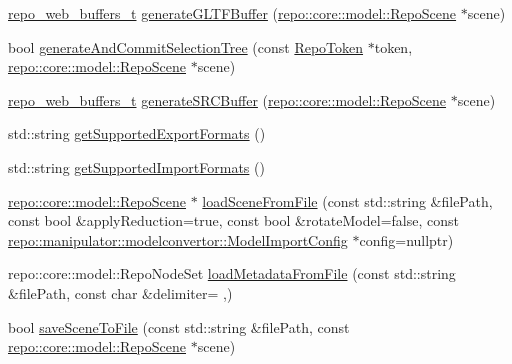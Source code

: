 \begin{DoxyCompactItemize}
\item 
\hyperlink{structrepo__web__buffers__t}{repo\+\_\+web\+\_\+buffers\+\_\+t} \hyperlink{class_repo_controller_1_1___repo_controller_impl_aed03fc24e4dd110f15bd4b6be107b732}{generate\+G\+L\+T\+F\+Buffer} (\hyperlink{classrepo_1_1core_1_1model_1_1_repo_scene}{repo\+::core\+::model\+::\+Repo\+Scene} $\ast$scene)
\item 
bool \hyperlink{class_repo_controller_1_1___repo_controller_impl_a0ae1a2789c4ff637b6578f372630cbdd}{generate\+And\+Commit\+Selection\+Tree} (const \hyperlink{class_repo_controller_1_1_repo_token}{Repo\+Token} $\ast$token, \hyperlink{classrepo_1_1core_1_1model_1_1_repo_scene}{repo\+::core\+::model\+::\+Repo\+Scene} $\ast$scene)
\item 
\hyperlink{structrepo__web__buffers__t}{repo\+\_\+web\+\_\+buffers\+\_\+t} \hyperlink{class_repo_controller_1_1___repo_controller_impl_ae34610e33c3acb775a8a6d2eb3a8474a}{generate\+S\+R\+C\+Buffer} (\hyperlink{classrepo_1_1core_1_1model_1_1_repo_scene}{repo\+::core\+::model\+::\+Repo\+Scene} $\ast$scene)
\item 
std\+::string \hyperlink{class_repo_controller_1_1___repo_controller_impl_a41dd45129cf941a698906ce4078549b1}{get\+Supported\+Export\+Formats} ()
\item 
std\+::string \hyperlink{class_repo_controller_1_1___repo_controller_impl_a2e6d9e9a575c6302f2c887afd190190f}{get\+Supported\+Import\+Formats} ()
\item 
\hyperlink{classrepo_1_1core_1_1model_1_1_repo_scene}{repo\+::core\+::model\+::\+Repo\+Scene} $\ast$ \hyperlink{class_repo_controller_1_1___repo_controller_impl_a5cf378dadbbb99c1163b29bf5f7d7e12}{load\+Scene\+From\+File} (const std\+::string \&file\+Path, const bool \&apply\+Reduction=true, const bool \&rotate\+Model=false, const \hyperlink{classrepo_1_1manipulator_1_1modelconvertor_1_1_model_import_config}{repo\+::manipulator\+::modelconvertor\+::\+Model\+Import\+Config} $\ast$config=nullptr)
\item 
repo\+::core\+::model\+::\+Repo\+Node\+Set \hyperlink{class_repo_controller_1_1___repo_controller_impl_a4da645a6f9993e50a8cd5bd913287aa5}{load\+Metadata\+From\+File} (const std\+::string \&file\+Path, const char \&delimiter= \textquotesingle{},\textquotesingle{})
\item 
bool \hyperlink{class_repo_controller_1_1___repo_controller_impl_a9068443a12ea798165e4dab48db9b337}{save\+Scene\+To\+File} (const std\+::string \&file\+Path, const \hyperlink{classrepo_1_1core_1_1model_1_1_repo_scene}{repo\+::core\+::model\+::\+Repo\+Scene} $\ast$scene)

\end{DoxyCompactItemize}
